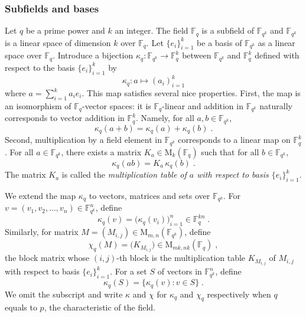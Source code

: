 \documentclass[11pt]{article}
\theoremstyle{definition}
\newcommand{\F}{\ensuremath{\mathbb{F}}}
\newcommand{\Fq}{\F_q}
\newcommand{\downsize}{\kappa}
\newcommand{\downsizem}{\chi}
\newcommand{\Matrix}{\mathrm{M}}
\begin{document}
\subsubsection{Subfields and bases}
\label{sec:subfields}
Let $q$ be a prime power and $k$ an integer. 
The field $\Fq$ is a subfield of $\F_{q^k}$ and $\F_{q^k}$ is a linear space of
dimension $k$ over $\Fq$.
Let $\{ e_i \}_{i=1}^k$ be a basis of $\F_{q^k}$ as a linear space over $\Fq$.
Introduce a bijection $\downsize_q : \F_{q^k} \rightarrow \Fq^k$ between
$\F_{q^k}$ and $\Fq^k$ defined with respect to the basis $\{ e_i \}_{i=1}^k$ by
\begin{equation*}
  \downsize_q : a \mapsto (a_i)_{i=1}^k
\end{equation*}
where $a = \sum_{i=1}^k a_i e_i$.
This map satisfies several nice properties.
First, the map is an isomorphism of $\Fq$-vector spaces: it is $\Fq$-linear and addition in $\F_{q^k}$
naturally corresponds to vector addition in $\Fq^k$.
Namely, for all $a,b \in \F_{q^k}$,
\begin{equation*}
	\downsize_q (a + b) = \downsize_q(a) + \downsize_q(b)\;.
\end{equation*}
Second, multiplication by a field element in $\F_{q^k}$ corresponds to a linear
map on $\F_{q}^k$.
For all $a \in \F_{q^k}$, there exists a matrix $K_a \in \Matrix_k (\Fq)$ such
that for all $b \in \F_{q^k}$,
\begin{equation*}
	\downsize_q (a b) = K_a \, \downsize_q(b)\;.
\end{equation*}
The matrix $K_a$ is called the \emph{multiplication table of $a$ with respect to
  basis $\{e_i\}_{i=1}^k$}.

We extend the map $\downsize_q$ to vectors, matrices and sets over $\F_{q^k}$.
For $v = (v_1, v_2, \ldots, v_n) \in \F_{q^k}^n$, define
\begin{equation*}
  \downsize_q (v) = \bigl( \downsize_q (v_i) \bigr)_{i=1}^n \in \Fq^{kn}\;.
\end{equation*}
Similarly, for matrix $M = (M_{i, j}) \in \Matrix_{m, n}(\F_{q^k})$, define
\begin{equation*}
  \downsizem_q (M) = \bigl( K_{M_{i, j}} \bigr) \in \Matrix_{mk, nk} (\Fq)\;,
\end{equation*}
the block matrix whose $(i,j)$-th block is the multiplication table $K_{M_{i,
    j}}$ of $M_{i, j}$ with respect to basis $\{e_i\}_{i=1}^k$.
For a set $S$ of vectors in $\F_{q^k}^n$, define
\begin{equation*}
	\downsize_q(S) = \{ \downsize_q(v) : v \in S \}\;.
\end{equation*}
We omit the subscript and write $\downsize$ and $\downsizem$ for $\downsize_q$
and $\downsizem_q$ respectively when $q$ equals to $p$, the characteristic of
the field.
\end{document}
